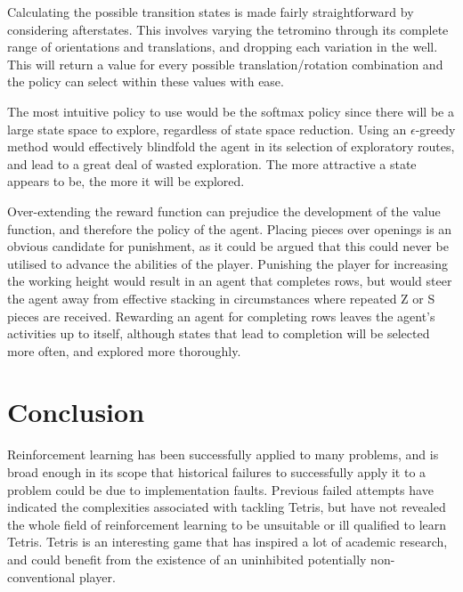 \documentclass[a4paper]{article}%
\begin{document}
Calculating the possible transition states is made fairly straightforward by considering afterstates\citep{kurt}. This involves varying the tetromino through its complete range of orientations and translations, and dropping each variation in the well. This will return a value for every possible translation/rotation combination and the policy can select within these values with ease.

The most intuitive policy to use would be the softmax policy since there will be a large state space to explore, regardless of state space reduction. Using an $\epsilon$-greedy method would effectively blindfold the agent in its selection of exploratory routes, and lead to a great deal of wasted exploration. The more attractive a state appears to be, the more it will be explored.

Over-extending the reward function can prejudice the development of the value function, and therefore the policy of the agent. Placing pieces over openings is an obvious candidate for punishment, as it could be argued that this could never be utilised to advance the abilities of the player. Punishing the player for increasing the working height would result in an agent that completes rows, but would steer the agent away from effective stacking in circumstances where repeated Z or S pieces are received. Rewarding an agent for completing rows leaves the agent's activities up to itself, although states that lead to completion will be selected more often, and explored more thoroughly.

\section{Conclusion}

Reinforcement learning has been successfully applied to many problems, and is broad enough in its scope that historical failures to successfully apply it to a problem could be due to implementation faults. Previous failed attempts have indicated the complexities associated with tackling Tetris, but have not revealed the whole field of reinforcement learning to be unsuitable or ill qualified to learn Tetris. Tetris is an interesting game that has inspired a lot of academic research, and could benefit from the existence of an uninhibited potentially non-conventional player. 


\end{document}
